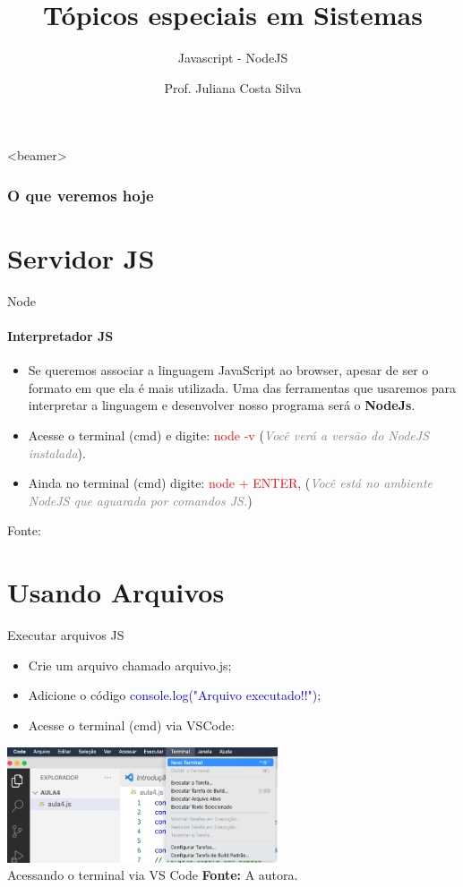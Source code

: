\documentclass{beamer}
\title{Tópicos especiais em Sistemas}
\subtitle{Javascript - NodeJS}
\author{Prof. Juliana Costa Silva}
\begin{document}
  \frame[c]{\maketitle}
    \begin{frame}<beamer>
      \frametitle{O que veremos hoje}
      \tableofcontents
    \end{frame}
    \section{Servidor JS}
    \begin{frame}{Node}
      \framesubtitle{Interpretador JS}%
      
      \begin{itemize}
            \item Se queremos associar a linguagem JavaScript ao browser, apesar de ser o formato em que ela é mais utilizada. Uma das ferramentas que usaremos para interpretar a linguagem e desenvolver nosso programa será o \textbf{NodeJs}.
            \item Acesse o terminal (cmd) e digite:  \textcolor{red}{node -v} (\textcolor{gray}{\textit{Você verá a versão do NodeJS instalada}}).
            \item Ainda no terminal (cmd) digite:  \textcolor{red}{node + ENTER}, (\textcolor{gray}{\textit{Você está no ambiente NodeJS que aguarada por comandos JS.}})
       \end{itemize}
       \tiny{Fonte: \cite{nodejs2022api}}
     \end{frame}
\section{Usando Arquivos}
\begin{frame}{Executar arquivos JS}

    \begin{itemize}
        \item Crie um arquivo chamado arquivo.js;
        \item Adicione o código \textcolor{blue}{console.log("Arquivo executado!!")};
        \item Acesse o terminal (cmd) via VSCode:  
    \end{itemize}
    \centering
	\includegraphics[width=80mm]{resources/aula_js_4_1.png}\\
            \tiny{ Acessando o terminal via VS Code \textbf{Fonte:} A autora.}
\end{frame}
\end{document}
